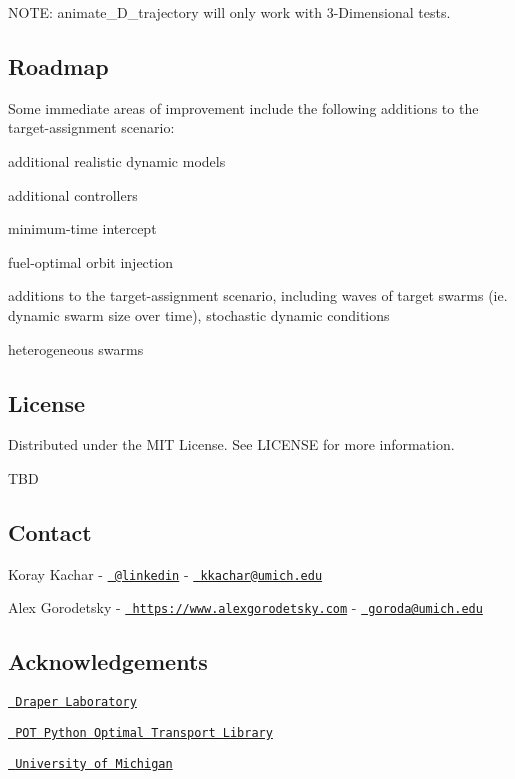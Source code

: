 N\+O\+TE\+: animate\+\_\+D\+\_\+trajectory will only work with 3-\/Dimensional tests.

\subsection*{Roadmap}

Some immediate areas of improvement include the following additions to the target-\/assignment scenario\+:
\begin{DoxyItemize}
\item additional realistic dynamic models
\item additional controllers
\begin{DoxyItemize}
\item minimum-\/time intercept
\item fuel-\/optimal orbit injection
\end{DoxyItemize}
\item additions to the target-\/assignment scenario, including waves of target swarms (ie. dynamic swarm size over time), stochastic dynamic conditions
\item heterogeneous swarms
\end{DoxyItemize}

\subsection*{License}

Distributed under the M\+IT License. See {\ttfamily L\+I\+C\+E\+N\+SE} for more information.

T\+BD

\subsection*{Contact}


\begin{DoxyItemize}
\item Koray Kachar -\/ \href{https://www.linkedin.com/in/koray-kachar/}{\texttt{ @linkedin}} -\/ \href{mailto:kkachar@umich.edu}{\texttt{ kkachar@umich.\+edu}}
\item Alex Gorodetsky -\/ \href{https://www.alexgorodetsky.com}{\texttt{ https\+://www.\+alexgorodetsky.\+com}} -\/ \href{mailto:goroda@umich.edu}{\texttt{ goroda@umich.\+edu}}
\end{DoxyItemize}

\subsection*{Acknowledgements}


\begin{DoxyItemize}
\item \href{https://www.draper.com}{\texttt{ Draper Laboratory}}
\item \href{https://github.com/rflamary/POT}{\texttt{ P\+OT Python Optimal Transport Library}}
\item \href{https://aero.engin.umich.edu}{\texttt{ University of Michigan}} 
\end{DoxyItemize}